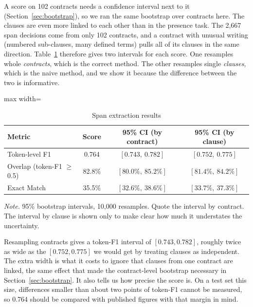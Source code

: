 A score on 102 contracts needs a confidence interval next to it (Section~\ref{sec:bootstrap}), so we ran the same bootstrap over contracts here. The clauses are even more linked to each other than in the presence task. The 2{,}667 span decisions come from only 102 contracts, and a contract with unusual writing (numbered sub-clauses, many defined terms) pulls all of its clauses in the same direction. Table~\ref{tab:span} therefore gives two intervals for each score. One resamples whole \emph{contracts}, which is the correct method. The other resamples single \emph{clauses}, which is the naive method, and we show it because the difference between the two is informative.

\begin{table}[!htbp]
\centering
\caption{Span extraction results}
\label{tab:span}
\small
\begin{adjustbox}{max width=\textwidth}
\begin{tabular}{lccc}
\toprule
\textbf{Metric} & \textbf{Score} & \textbf{95\% CI (by contract)} & \textbf{95\% CI (by clause)}\\
\midrule
Token-level F1                & 0.764 & $[0.743,\ 0.782]$ & $[0.752,\ 0.775]$\\
Overlap (token-F1 $\geq$ 0.5) & 82.8\% & $[80.0\%,\ 85.2\%]$ & $[81.4\%,\ 84.2\%]$\\
Exact Match                   & 35.5\% & $[32.6\%,\ 38.6\%]$ & $[33.7\%,\ 37.3\%]$\\
\bottomrule
\end{tabular}
\end{adjustbox}

{\footnotesize\singlespacing \emph{Note.} 95\% bootstrap intervals, 10{,}000 resamples. Quote the interval by contract. The interval by clause is shown only to make clear how much it understates the uncertainty.\par}
\end{table}

Resampling contracts gives a token-F1 interval of $[0.743, 0.782]$, roughly twice as wide as the $[0.752, 0.775]$ we would get by treating clauses as independent. The extra width is what it costs to ignore that clauses from one contract are linked, the same effect that made the contract-level bootstrap necessary in Section~\ref{sec:bootstrap}. It also tells us how precise the score is. On a test set this size, differences smaller than about two points of token-F1 cannot be measured, so 0.764 should be compared with published figures with that margin in mind.

